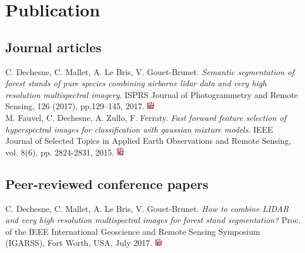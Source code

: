 
\chapter{Publication} %

\label{Publication} %

\startcontents[chapters]
\Mprintcontents


\section{Journal articles}

C. Dechesne, C. Mallet, A. Le Bris, V. Gouet-Brunet. \textit{Semantic segmentation of forest stands of pure species combining airborne lidar data and very high resolution multispectral imagery}. ISPRS Journal of Photogrammetry and Remote Sensing, 126 (2017), pp.129–145, 2017. \href{http://recherche.ign.fr/labos/matis/pdf/articles_revues/2017/semantic_segmentation.pdf}{\includegraphics[height=10pt]{Appendices/ic_pdf.jpg}} \\

M. Fauvel, C. Dechesne, A. Zullo, F. Ferraty. \textit{Fast forward feature selection of hyperspectral images for classification with gaussian mixture models}. IEEE Journal of Selected Topics in Applied Earth Observations and Remote Sensing, vol. 8(6), pp. 2824-2831, 2015. \href{https://arxiv.org/pdf/1501.00857v1.pdf}{\includegraphics[height=10pt]{Appendices/ic_pdf.jpg}} \\

\section{Peer-reviewed conference papers}

C. Dechesne, C. Mallet, A. Le Bris, V. Gouet-Brunet. \textit{How to combine LIDAR and very high resolution multispectral images for forest stand segmentation?} Proc. of the IEEE International Geoscience and Remote Sensing Symposium (IGARSS), Fort Worth, USA, July 2017. \href{http://recherche.ign.fr/labos/matis/pdf/articles_conf/2017/IGARSS_2017_Dechesne_Clement_final.pdf}{\includegraphics[height=10pt]{Appendices/ic_pdf.jpg}} \\

